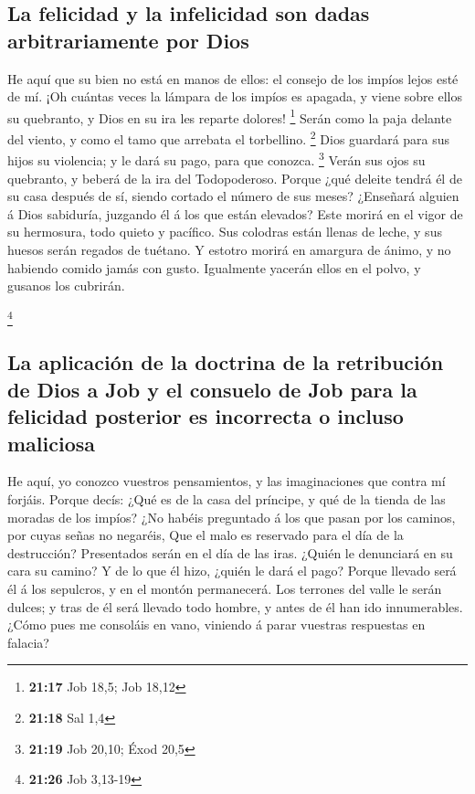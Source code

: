 \hypertarget{la-felicidad-y-la-infelicidad-son-dadas-arbitrariamente-por-dios}{%
\subsection{La felicidad y la infelicidad son dadas arbitrariamente por
Dios}\label{la-felicidad-y-la-infelicidad-son-dadas-arbitrariamente-por-dios}}

 He aquí que su bien no está en manos de ellos: el
consejo de los impíos lejos esté de mí.  ¡Oh cuántas
veces la lámpara de los impíos es apagada, y viene sobre ellos su
quebranto, y Dios en su ira les reparte dolores! \footnote{\textbf{21:17}
  Job 18,5; Job 18,12}  Serán como la paja delante del
viento, y como el tamo que arrebata el torbellino. \footnote{\textbf{21:18}
  Sal 1,4}  Dios guardará para sus hijos su violencia; y
le dará su pago, para que conozca. \footnote{\textbf{21:19} Job 20,10;
  Éxod 20,5}  Verán sus ojos su quebranto, y beberá de la
ira del Todopoderoso.  Porque ¿qué deleite tendrá él de
su casa después de sí, siendo cortado el número de sus meses?
 ¿Enseñará alguien á Dios sabiduría, juzgando él á los
que están elevados?  Este morirá en el vigor de su
hermosura, todo quieto y pacífico.  Sus colodras están
llenas de leche, y sus huesos serán regados de tuétano. 
Y estotro morirá en amargura de ánimo, y no habiendo comido jamás con
gusto.  Igualmente yacerán ellos en el polvo, y gusanos
los cubrirán.

\footnote{\textbf{21:26} Job 3,13-19}

\hypertarget{la-aplicaciuxf3n-de-la-doctrina-de-la-retribuciuxf3n-de-dios-a-job-y-el-consuelo-de-job-para-la-felicidad-posterior-es-incorrecta-o-incluso-maliciosa}{%
\subsection{La aplicación de la doctrina de la retribución de Dios a Job
y el consuelo de Job para la felicidad posterior es incorrecta o incluso
maliciosa}\label{la-aplicaciuxf3n-de-la-doctrina-de-la-retribuciuxf3n-de-dios-a-job-y-el-consuelo-de-job-para-la-felicidad-posterior-es-incorrecta-o-incluso-maliciosa}}

 He aquí, yo conozco vuestros pensamientos, y las
imaginaciones que contra mí forjáis.  Porque decís: ¿Qué
es de la casa del príncipe, y qué de la tienda de las moradas de los
impíos?  ¿No habéis preguntado á los que pasan por los
caminos, por cuyas señas no negaréis,  Que el malo es
reservado para el día de la destrucción? Presentados serán en el día de
las iras.  ¿Quién le denunciará en su cara su camino? Y
de lo que él hizo, ¿quién le dará el pago?  Porque
llevado será él á los sepulcros, y en el montón permanecerá.
 Los terrones del valle le serán dulces; y tras de él
será llevado todo hombre, y antes de él han ido innumerables.
 ¿Cómo pues me consoláis en vano, viniendo á parar
vuestras respuestas en falacia?

